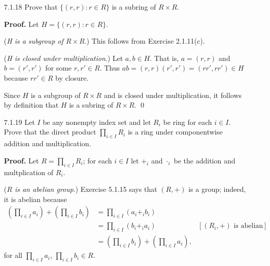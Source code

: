 \begin{enumerate}
      ($\Leftarrow$) Suppose that $1_R \in R$ and $1_S \in S$ are identities.
      Let $a'' \in R \times S$. So $a'' = (r_9, s_9)$ for some $r_9 \in R$ and 
      $s_9 \in S$. Thus
      $$
         a''(1_R, 1_S) = (r_9, s_9)(1_R, 1_S) = (r_9 \cdot 1_R, s_9 \cdot 1_S) 
            = (r_9, s_9) = a''
      $$
      and
      $$
         (1_R, 1_S)a'' = (1_R, 1_S)(r_9, s_9) = (1_R \cdot r_9, 1_S \cdot s_9) 
            = (r_9, s_9) = a''.
      $$
      Hence $(1_R, 1_S)$ is an identity in $R \times S$. \qed
   \item[7.1.18]  Prove that $\{(r, r) : r \in R\}$ is a subring of
                  $R \times R$.

      \textbf{Proof.} Let $H = \{(r, r) : r \in R\}$.

      (\textit{H is a subgroup of $R \times R$}.) This follows from Exercise 
      2.1.11(c).

      (\textit{H is closed under multiplication}.) Let $a, b \in H$. That is,
      $a = (r, r)$ and $b = (r', r')$ for some $r, r' \in R$. Thus
      $ab = (r, r)(r', r') = (rr', rr') \in H$ because $rr' \in R$ by closure.

      Since $H$ is a subgroup of $R \times R$ and is closed under
      multiplication, it follows by definition that $H$ is a subring of
      $R \times R$. \qed
   \item[7.1.19]  Let $I$ be any nonempty index set and let $R_i$ be ring for
                  each $i \in I$. Prove that the direct product
                  $\prod_{i\in I} R_i$ is a ring under componentwise addition
                  and multiplication.

      \textbf{Proof.} Let $R = \prod_{i\in I} R_i$; for each $i \in I$ let
      $+_i$ and $\cdot_i$ be the addition and multplication of $R_i$.

      (\textit{$R$ is an abelian group}.) Exercise 5.1.15 says that $(R, +)$ is 
      a group; indeed, it is abelian because
      \begin{align*}
         \left(\prod_{i\in I}a_i\right) + \left(\prod_{i\in I}b_i\right)
            &= \prod_{i\in I}(a_i +_i b_i) \\
            &= \prod_{i\in I}(b_i +_i a_i) &[(R_i, +) \text{ is abelian}] \\
            &= \left(\prod_{i\in I}b_i\right) + \left(\prod_{i\in I}a_i\right),
      \end{align*}
      for all $\prod_{i\in I}a_i$, $\prod_{i\in I}b_i \in R$.


\end{enumerate}
